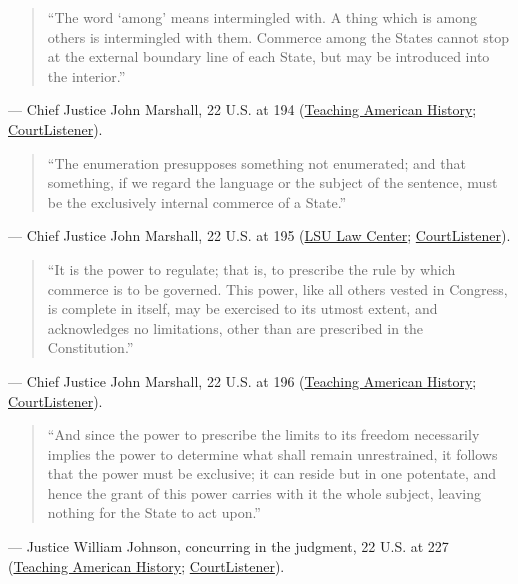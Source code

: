 \documentclass[12pt]{article}
\begin{document}
\begin{quote}
``The word `among' means intermingled with. A thing which is among others is intermingled with them. Commerce among the States cannot stop at the external boundary line of each State, but may be introduced into the interior.''
\end{quote}
\noindent --- Chief Justice John Marshall, 22 U.S. at 194 (\href{https://teachingamericanhistory.org/document/gibbons-v-ogden/}{Teaching American History}; \href{https://www.courtlistener.com/opinion/85412/gibbons-v-ogden/}{CourtListener}).

\begin{quote}
``The enumeration presupposes something not enumerated; and that something, if we regard the language or the subject of the sentence, must be the exclusively internal commerce of a State.''
\end{quote}
\noindent --- Chief Justice John Marshall, 22 U.S. at 195 (\href{https://biotech.law.lsu.edu/cases/pp/Gibbons.htm}{LSU Law Center}; \href{https://www.courtlistener.com/opinion/85412/gibbons-v-ogden/}{CourtListener}).

\begin{quote}
``It is the power to regulate; that is, to prescribe the rule by which commerce is to be governed. This power, like all others vested in Congress, is complete in itself, may be exercised to its utmost extent, and acknowledges no limitations, other than are prescribed in the Constitution.''
\end{quote}
\noindent --- Chief Justice John Marshall, 22 U.S. at 196 (\href{https://teachingamericanhistory.org/document/gibbons-v-ogden/}{Teaching American History}; \href{https://www.courtlistener.com/opinion/85412/gibbons-v-ogden/}{CourtListener}).

\begin{quote}
``And since the power to prescribe the limits to its freedom necessarily implies the power to determine what shall remain unrestrained, it follows that the power must be exclusive; it can reside but in one potentate, and hence the grant of this power carries with it the whole subject, leaving nothing for the State to act upon.''
\end{quote}
\noindent --- Justice William Johnson, concurring in the judgment, 22 U.S. at 227 (\href{https://teachingamericanhistory.org/document/gibbons-v-ogden/}{Teaching American History}; \href{https://www.courtlistener.com/opinion/85412/gibbons-v-ogden/}{CourtListener}).
\end{document}
